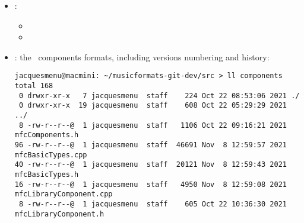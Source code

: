 \begin{itemize}
\begin{itemize}
  \item {}
  \item {}
  \item {}
  \item {}\\[-0.5ex]
  \end{itemize}

\item {} :
  \begin{itemize}
  \item {}
  \item {}
  \end{itemize}

\item {} : the \mf\ components formats, including versions numbering and history:
\begin{lstlisting}[language=Terminal]
jacquesmenu@macmini: ~/musicformats-git-dev/src > ll components
total 168
 0 drwxr-xr-x   7 jacquesmenu  staff    224 Oct 22 08:53:06 2021 ./
 0 drwxr-xr-x  19 jacquesmenu  staff    608 Oct 22 05:29:29 2021 ../
 8 -rw-r--r--@  1 jacquesmenu  staff   1106 Oct 22 09:16:21 2021 mfcComponents.h
96 -rw-r--r--@  1 jacquesmenu  staff  46691 Nov  8 12:59:57 2021 mfcBasicTypes.cpp
40 -rw-r--r--@  1 jacquesmenu  staff  20121 Nov  8 12:59:43 2021 mfcBasicTypes.h
16 -rw-r--r--@  1 jacquesmenu  staff   4950 Nov  8 12:59:08 2021 mfcLibraryComponent.cpp
 8 -rw-r--r--@  1 jacquesmenu  staff    605 Oct 22 10:36:30 2021 mfcLibraryComponent.h
\end{lstlisting}


\end{itemize}

